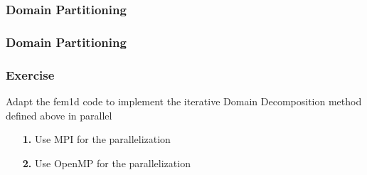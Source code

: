 \documentclass[smaller,a4paper]{beamer}
\begin{document}
\begin{frame}\frametitle{Domain Partitioning}
\end{frame}

\begin{frame}\frametitle{Domain Partitioning}
\end{frame}

\begin{frame}\frametitle{Exercise}

Adapt the fem1d code to implement the iterative Domain Decomposition
method defined above in parallel

\begin{itemize}
\item [{\bf 1.}] Use MPI for the parallelization
\item [{\bf 2.}] Use OpenMP for the parallelization
\end{itemize}


\end{frame}
\end{document}
